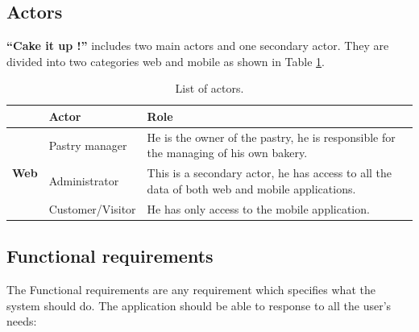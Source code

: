 \documentclass[12pt,a4paper]{report}
\begin{document}
	\subsection{Actors}
	\textbf{``Cake it up !''} includes two main actors and one secondary actor. They are divided into two categories web and mobile as shown in Table \ref{table-actors}.
	\\
	\begin{table}[H]
		\begin{center}
			\caption{\label{table-actors} List of actors.} 
			\captionsetup[table]{skip=10pt}
			\setlength\doublerulesep{0.5pt}
			\begin{tabular}{|l|p{5cm}|p{8cm}| } 
				\hline\hline
				\rowcolor{LightCyan}
				& \textbf{Actor}   & \textbf{Role}                                                                                 \\
				\hline
				\hline
				\multirow{3}{*}{\textbf{Web} }
				
				& Pastry manager   & He is the owner of the pastry, he is responsible for the managing of his own bakery.          \\
				\cline{2-3}
				& Administrator    & This is a secondary actor, he has access to all the data of both web and mobile applications. \\
				\hline
				\hline
				\textbf{Mobile} & Customer/Visitor & He has only access to the mobile application.                                                 \\
				
				\hline
			\end{tabular}
		\end{center}
		
	\end{table}
	
	\subsection{Functional requirements}
	The Functional requirements are any requirement which specifies what the system should do.
	The application should be able to response to all the user’s needs:
	
\end{document}
